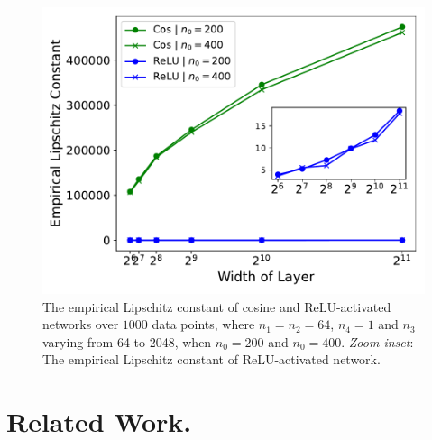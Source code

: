 \documentclass{article}
\theoremstyle{plain}
\theoremstyle{definition}
\theoremstyle{remark}
\begin{document}
\begin{figure}
\includegraphics[width=1.0\linewidth]{experiments/ICML_lipschitz_constant_all.pdf}
\hspace{-0.2cm}
\caption{The empirical Lipschitz constant of cosine and ReLU-activated networks over $1000$ data points, where $n_1 = n_2 = 64$, $n_4 = 1$ and $n_3$ varying from 64 to 2048,  when $n_0 = 200$ and $n_0 =400$. \textit{Zoom inset}: The empirical Lipschitz constant of ReLU-activated network.}\label{fig:lipschitz_constant_all}
\end{figure}


\section{Related Work.}\label{related_work}


\end{document}
